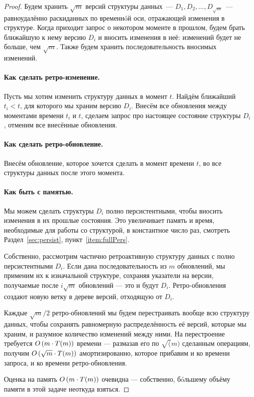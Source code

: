 \begin{proof}
	Будем хранить $\sqrt{m}$ версий структуры данных~— $D_1, D_2, \ldots, D_{\sqrt{m}}$~— равноудалённо раскиданных по временн\'oй оси, отражающей изменения в структуре. Когда приходит запрос о некотором моменте в прошлом, будем брать ближайшую к нему версию $D_i$ и вносить изменения в неё: изменений будет не больше, чем $\sqrt{m}$. Также будем хранить последовательность вносимых изменений.

	\paragraph{Как сделать ретро-изменение.} Пусть мы хотим изменить структуру данных в момент $t$. Найдём ближайший $t_i < t$, для которого мы храним версию $D_i$. Внесём все обновления между моментами времени $t_i$ и $t$, сделаем запрос про настоящее состояние структуры $D_i$, отменим все внесённые обновления.

	\paragraph{Как сделать ретро-обновление.} Внесём обновление, которое хочется сделать в момент времени $t$, во все структуры данных после этого момента.

	\paragraph{Как быть с памятью.} Мы можем сделать структуры $D_i$ полно персистентными, чтобы вносить изменения в их прошлые состояния.  Это увеличивает память и время, необходимые для работы со структурой, в константное число раз, смотреть Раздел~\ref{sec:persist}, пункт~\ref{item:fullPers}.
	
	Собственно, рассмотрим частично ретроактивную структуру данных с полно персистентными $D_i$. Если дана последовательность из $m$ обновлений, мы применим их к изначальной структуре, сохраняя указатели на версии, получаемые после $i \sqrt{m}$ обновлений — это и будут $D_i$. Ретро-обновления создают новую ветку в дереве версий, отходящую от $D_i$.
	
	Каждые $\sqrt{m} / 2$ ретро-обновлений мы будем перестраивать вообще всю структуру данных, чтобы сохранять равномерную распределённость её версий, которые мы храним, и разумное количество изменений между ними. На перестроение требуется $O \left( m \cdot T(m) \right)$ времени — размазав его по $\sqrt(m)$ сделанным операциям, получим $O \left( \sqrt{m} \cdot T(m) \right)$ амортизированно, которое прибавим и ко времени запроса, и ко времени ретро-обновления.
	
	Оценка на память $O \left( m \cdot T(m) \right)$ очевидна — собственно, б\'oльшему объёму памяти в этой задаче неоткуда взяться.
\end{proof}

